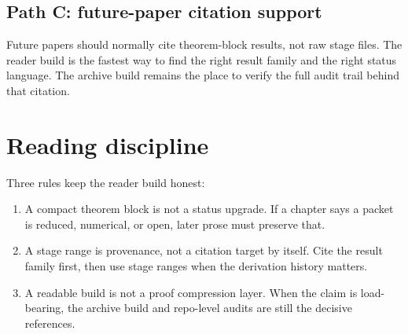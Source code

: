 \subsection*{Path C: future-paper citation support}

Future papers should normally cite theorem-block results, not raw stage files.
The reader build is the fastest way to find the right result family and the
right status language. The archive build remains the place to verify the full
audit trail behind that citation.

\section{Reading discipline}

Three rules keep the reader build honest:
\begin{enumerate}[leftmargin=2.2em]
  \item A compact theorem block is not a status upgrade. If a chapter says a
  packet is reduced, numerical, or open, later prose must preserve that.
  \item A stage range is provenance, not a citation target by itself. Cite the
  result family first, then use stage ranges when the derivation history matters.
  \item A readable build is not a proof compression layer. When the claim is
  load-bearing, the archive build and repo-level audits are still the decisive
  references.
\end{enumerate}
